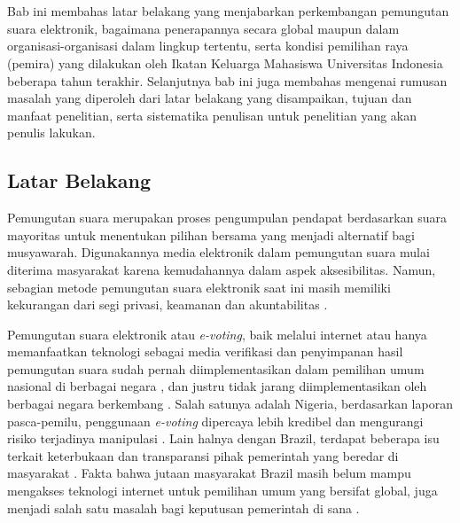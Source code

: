 \chapter{\babSatu}
\label{bab:1}
Bab ini membahas latar belakang yang menjabarkan perkembangan pemungutan suara elektronik, bagaimana penerapannya secara global maupun dalam organisasi-organisasi dalam lingkup tertentu, serta kondisi pemilihan raya (pemira) yang dilakukan oleh Ikatan Keluarga Mahasiswa Universitas Indonesia beberapa tahun terakhir. Selanjutnya bab ini juga membahas mengenai rumusan masalah yang diperoleh dari latar belakang yang disampaikan, tujuan dan manfaat penelitian, serta sistematika penulisan untuk penelitian yang akan penulis lakukan.


\section{Latar Belakang}

Pemungutan suara merupakan proses pengumpulan pendapat berdasarkan suara mayoritas untuk menentukan pilihan bersama yang menjadi alternatif bagi musyawarah. Digunakannya media elektronik dalam pemungutan suara mulai diterima masyarakat karena kemudahannya dalam aspek aksesibilitas. Namun, sebagian metode pemungutan suara elektronik saat ini masih memiliki kekurangan dari segi privasi, keamanan dan akuntabilitas \citep{7571928}. 

Pemungutan suara elektronik atau \textit{e-voting}, baik melalui internet atau hanya memanfaatkan teknologi sebagai media verifikasi dan penyimpanan hasil pemungutan suara sudah pernah diimplementasikan dalam pemilihan umum nasional di berbagai negara \citep{7001135}, dan justru tidak jarang diimplementasikan oleh berbagai negara berkembang \citep{reviewevote}. Salah satunya adalah Nigeria, berdasarkan laporan pasca-pemilu, penggunaan \textit{e-voting} dipercaya lebih kredibel dan mengurangi risiko terjadinya manipulasi \citep{nigeria}. Lain halnya dengan Brazil, terdapat beberapa isu terkait keterbukaan dan transparansi pihak pemerintah yang beredar di masyarakat \citep{avgerou}. Fakta bahwa jutaan masyarakat Brazil masih belum mampu mengakses teknologi internet untuk pemilihan umum yang bersifat global, juga menjadi salah satu masalah bagi keputusan pemerintah di sana \citep{mci/Filho2008}.

